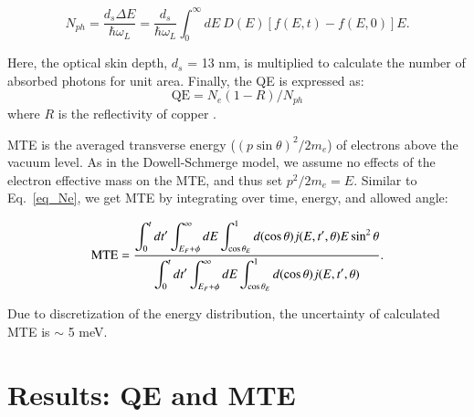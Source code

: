 	\begin{equation}\label{eq_Nph}
		N_{ph} = \frac{d_s \Delta E}{ \hbar \omega_L} = \frac{d_{s}}{\hbar \omega_L} \int_0^\infty dE \: D(E) [f(E,t)-f(E,0)] E.
	\end{equation}

Here, the optical skin depth, $d_s$ = 13 nm,\cite{CuRefl} is multiplied to calculate the number of absorbed photons for unit area. Finally, the QE is expressed as:
\begin{equation}\label{eq_qe}
	\textrm{QE} = N_e (1-R) / N_{ph}
\end{equation}
where $R$ is the reflectivity of copper \cite{CuRefl}.

MTE is the averaged transverse energy ($(p \sin\theta)^2/2m_e$) of electrons above the vacuum level. As in the Dowell-Schmerge model,  we assume no effects of the electron effective mass on the MTE, and thus  set $p^2/2m_e = E$. Similar to Eq.~\ref{eq_Ne}, we get MTE by integrating over time, energy, and allowed angle:

	\begin{equation}\label{eq_mte}
		\textmd{MTE} = \frac{\displaystyle \int_0^t dt' \int_{E_F+\phi}^{\infty} dE \int_{\cos\theta_E}^1 d(\cos\theta) j(E,t',\theta) E \sin^2\theta}{\displaystyle \int_0^t dt' \int_{E_F+\phi}^{\infty} dE \int_{\cos\theta_E}^1 d(\cos\theta) j(E,t',\theta)}.
	\end{equation}

Due to discretization of the energy distribution, the uncertainty of calculated MTE is $\sim$ 5 meV.

\section{Results: QE and MTE}

